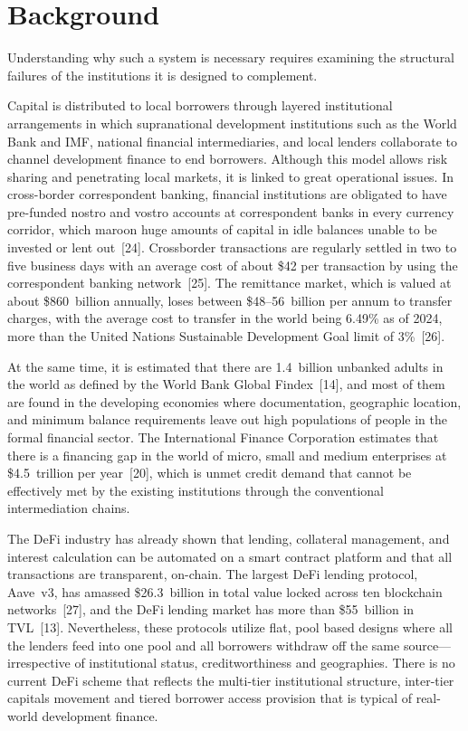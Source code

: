 \documentclass[12pt,a4paper]{report}
\begin{document}
\section{Background}

Understanding why such a system is necessary requires examining the structural failures of the institutions it is designed to complement.

Capital is distributed to local borrowers through layered institutional arrangements in which supranational development institutions such as the World Bank and IMF, national financial intermediaries, and local lenders collaborate to channel development finance to end borrowers. Although this model allows risk sharing and penetrating local markets, it is linked to great operational issues. In cross-border correspondent banking, financial institutions are obligated to have pre-funded nostro and vostro accounts at correspondent banks in every currency corridor, which maroon huge amounts of capital in idle balances unable to be invested or lent out~[24]. Crossborder transactions are regularly settled in two to five business days with an average cost of about \$42 per transaction by using the correspondent banking network~[25]. The remittance market, which is valued at about \$860~billion annually, loses between \$48--56~billion per annum to transfer charges, with the average cost to transfer in the world being 6.49\% as of 2024, more than the United Nations Sustainable Development Goal limit of 3\%~[26].

At the same time, it is estimated that there are 1.4~billion unbanked adults in the world as defined by the World Bank Global Findex~[14], and most of them are found in the developing economies where documentation, geographic location, and minimum balance requirements leave out high populations of people in the formal financial sector. The International Finance Corporation estimates that there is a financing gap in the world of micro, small and medium enterprises at \$4.5~trillion per year~[20], which is unmet credit demand that cannot be effectively met by the existing institutions through the conventional intermediation chains.

The DeFi industry has already shown that lending, collateral management, and interest calculation can be automated on a smart contract platform and that all transactions are transparent, on-chain. The largest DeFi lending protocol, Aave~v3, has amassed \$26.3~billion in total value locked across ten blockchain networks~[27], and the DeFi lending market has more than \$55~billion in TVL~[13]. Nevertheless, these protocols utilize flat, pool based designs where all the lenders feed into one pool and all borrowers withdraw off the same source---irrespective of institutional status, creditworthiness and geographies. There is no current DeFi scheme that reflects the multi-tier institutional structure, inter-tier capitals movement and tiered borrower access provision that is typical of real-world development finance.
\end{document}
